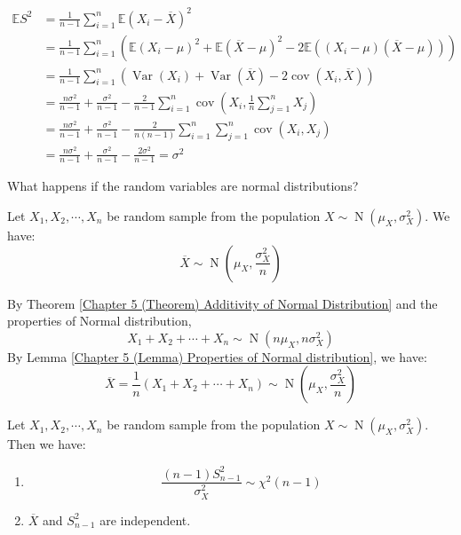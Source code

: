 \documentclass{huhtakm-template-book}
\newcommand{\expect}{\mathbb{E}}
\DeclareMathOperator{\N}{N}
\DeclareMathOperator{\Var}{Var}
\DeclareMathOperator{\cov}{cov}
\begin{document}
\begin{proofing}
	\begin{align*}
		\expect{S^{2}}&=\frac{1}{n-1}\sum_{i=1}^{n}\expect(X_{i}-\overline{X})^{2}\\
		&=\frac{1}{n-1}\sum_{i=1}^{n}(\expect(X_{i}-\mu)^{2}+\expect(\overline{X}-\mu)^{2}-2\expect((X_{i}-\mu)(\overline{X}-\mu)))\\
		&=\frac{1}{n-1}\sum_{i=1}^{n}(\Var(X_{i})+\Var(\overline{X})-2\cov(X_{i},\overline{X}))\\
		&=\frac{n\sigma^{2}}{n-1}+\frac{\sigma^{2}}{n-1}-\frac{2}{n-1}\sum_{i=1}^{n}\cov\left(X_{i},\frac{1}{n}\sum_{j=1}^{n}X_{j}\right)\\
		&=\frac{n\sigma^{2}}{n-1}+\frac{\sigma^{2}}{n-1}-\frac{2}{n(n-1)}\sum_{i=1}^{n}\sum_{j=1}^{n}\cov(X_{i},X_{j})\\
		&=\frac{n\sigma^{2}}{n-1}+\frac{\sigma^{2}}{n-1}-\frac{2\sigma^{2}}{n-1}=\sigma^{2}
	\end{align*}
\end{proofing}
What happens if the random variables are normal distributions?
\begin{thm}
	\label{Chapter 6 (Theorem) Sampling distribution with sample mean}
	Let $X_{1},X_{2},\cdots,X_{n}$ be random sample from the population $X\sim\N(\mu_{X},\sigma_{X}^{2})$. We have:
	\begin{equation*}
		\overline{X}\sim\N\left(\mu_{X},\frac{\sigma_{X}^{2}}{n}\right)
	\end{equation*}
\end{thm}
\begin{proofing}
	By Theorem \ref{Chapter 5 (Theorem) Additivity of Normal Distribution} and the properties of Normal distribution,
	\begin{equation*}
		X_{1}+X_{2}+\cdots+X_{n}\sim\N(n\mu_{X},n\sigma_{X}^{2})
	\end{equation*}
	By Lemma \ref{Chapter 5 (Lemma) Properties of Normal distribution}, we have:
	\begin{equation*}
		\overline{X}=\frac{1}{n}(X_{1}+X_{2}+\cdots+X_{n})\sim\N\left(\mu_{X},\frac{\sigma_{X}^{2}}{n}\right)
	\end{equation*}
\end{proofing}
\begin{thm}
	\label{Chapter 6 (Theorem) Sampling distribution with sample variance}
	Let $X_{1},X_{2},\cdots,X_{n}$ be random sample from the population $X\sim\N(\mu_{X},\sigma_{X}^{2})$. Then we have:
	\begin{enumerate}
		\item \begin{equation*}
			\frac{(n-1)S_{n-1}^{2}}{\sigma_{X}^{2}}\sim\chi^{2}(n-1)
		\end{equation*}
		\item $\overline{X}$ and $S_{n-1}^{2}$ are independent.
	\end{enumerate}
\end{thm}
\end{document}

